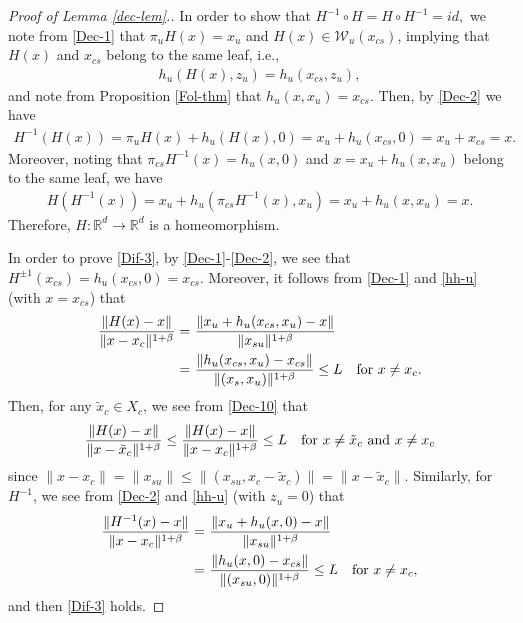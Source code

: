 \documentclass[reqno]{amsart}
\numberwithin{equation}{section}
\begin{document}
\begin{proof}[Proof of Lemma {\rm \ref{dec-lem}.}]
In order to show that
$
H^{-1}\circ H=H \circ H^{-1}=id,
$
we note from \eqref{Dec-1} that
$\pi_uH(x)=x_u$ and $H(x)\in \mathcal{W}_u(x_{cs})$, implying that $H(x)$ and $x_{cs}$ belong to the same leaf, i.e.,
\begin{align}\label{huhu}
h_u(H(x),z_u)=h_u(x_{cs},z_u),
\end{align}
and note from Proposition \ref{Fol-thm} that $h_u(x,x_u)=x_{cs}$.
Then, by \eqref{Dec-2} we have
\begin{align*}
H^{-1}(H(x)) =\pi_u H(x) + h_u(H(x),0)
=x_u+h_u(x_{cs},0)=x_u+x_{cs}=x.
\end{align*}
Moreover, noting that $\pi_{cs}H^{-1}(x)=h_u(x,0)$ and $x=x_u+h_u(x,x_u)$ belong to the same leaf, we have
\begin{align*}
H(H^{-1}(x))=x_u+h_u(\pi_{cs}H^{-1}(x),x_u)=x_u+h_u(x,x_u)=x.
\end{align*}
Therefore, $H:\mathbb{R}^d\to \mathbb{R}^d$ is a homeomorphism.

In order to prove \eqref{Dif-3}, by \eqref{Dec-1}-\eqref{Dec-2}, we see that $H^{\pm 1}(x_{cs})=h_u(x_{cs},0)=x_{cs}$.
Moreover, it follows from \eqref{Dec-1} and \eqref{hh-u} (with $x=x_{cs}$) that
\begin{align}\label{Dec-10}
\frac{\|H(x)-x\|}{\|x-x_c\|^{1+\beta}}
=&~  \frac{\|x_u+h_u(x_{cs},x_u)-x\|}{\|x_{su}\|^{1+\beta}}
\notag \\
= &~ \frac{\| h_u(x_{cs},x_u)-x_{cs}\|}{\|(x_s,x_u)\|^{1+\beta}}\le L\quad {\rm for}~x\ne x_c.
\end{align}
Then, for any $\tilde{x}_c\in X_c$, we see from \eqref{Dec-10} that
\begin{align}\label{Dec-11}
\frac{\|H(x)- x\|}{\|x-\tilde{x}_c\|^{1+\beta}}
\le \frac{\|H(x)- x\|}{\|x-x_c\|^{1+\beta}}\le L\quad {\rm for}~x\ne \tilde x_c~{\rm and}~x\ne x_c
\end{align}
since $\|x-x_c\|=\|x_{su}\| \le \|(x_{su}, x_c-\tilde{x}_c)\|= \|x-\tilde{x}_c\|$.
Similarly, for $H^{-1}$, we see from \eqref{Dec-2} and \eqref{hh-u} (with $z_u=0$) that
\begin{align*}
\frac{\|H^{-1}(x)-x\|}{\|x-x_c\|^{1+\beta}}
=&~  \frac{\|x_u+h_u(x,0)-x\|}{\|x_{su}\|^{1+\beta}}
\\
=&~  \frac{\| h_u(x,0)-x_{cs}\|}{\|(x_{su},0)\|^{1+\beta}}\le L\quad {\rm for}~x\ne x_c,
\end{align*}
and then \eqref{Dif-3} holds.


\end{proof}
\end{document}
